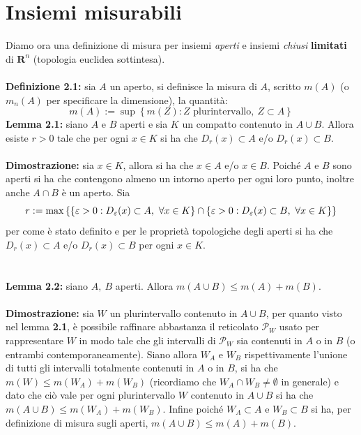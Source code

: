 \documentclass{article}
\begin{document}
\section{Insiemi misurabili}
Diamo ora una definizione di misura per insiemi \textit{aperti} e insiemi \textit{chiusi} \textbf{limitati }di $\mathbf{R}^n$ (topologia euclidea sottintesa). \\ \\
\textbf{Definizione 2.1:} sia $A$ un aperto, si definisce la misura di $A$, scritto $m(A)$ (o $m_n(A)$ per specificare la dimensione), la quantità:
\begin{equation}
    m(A) := \sup \left\{ m(Z) : Z \text{ plurintervallo}, \ Z \subset A \right\} \tag{2.1}
\end{equation}
\textbf{Lemma 2.1:} siano $A$ e $B$ aperti e sia $K$ un compatto contenuto in $A \cup B$. Allora esiste $r > 0$ tale che per ogni $x \in K$ si ha che $D_r(x) \subset A$ e/o $D_r(x) \subset B$. \\ \\
\textbf{Dimostrazione:} sia $x \in K$, allora si ha che $x \in A$ e/o $x \in B$. Poiché $A$ e $B$ sono aperti si ha che contengono almeno un intorno aperto per ogni loro punto, inoltre anche $A \cap B$ è un aperto. Sia
\begin{equation}
    r := \max \left\{ \left\{ \varepsilon > 0 : D_{\varepsilon} (x) \subset A, \ \forall x \in K \right\}\cap \left\{ \varepsilon > 0 : D_\varepsilon (x) \subset B, \ \forall x \in K \right\} \right\} \notag
\end{equation}
per come è stato definito e per le proprietà topologiche degli aperti si ha che $D_r(x) \subset A$ e/o $D_r(x) \subset B$ per ogni $x \in K$. \\ \\ \\
\textbf{Lemma 2.2:} siano $A, \ B$ aperti. Allora $m(A \cup B) \leq m(A) + m(B)$. \\ \\
\textbf{Dimostrazione:} sia $W$ un plurintervallo contenuto in $A \cup B$, per quanto visto nel lemma \textbf{2.1}, è possibile raffinare abbastanza il reticolato $\mathcal{P}_W$ usato per rappresentare $W$ in modo tale che gli intervalli di $\mathcal{P}_W$ sia contenuti in $A$ o in $B$ (o entrambi contemporaneamente). Siano allora $W_A$ e $W_B$ rispettivamente l'unione di tutti gli intervalli totalmente contenuti in $A$ o in $B$, si ha che $m(W) \leq m(W_A) + m(W_B)$ (ricordiamo che $W_A \cap W_B \neq \emptyset$ in generale) e dato che ciò vale per ogni plurintervallo $W$ contenuto in $A \cup B$ si ha che $m(A \cup B) \leq m(W_A) + m(W_B)$. Infine poiché $W_A \subset A$ e $W_B \subset B$ si ha, per definizione di misura sugli aperti, $m(A \cup B) \leq m(A) + m(B)$. \\ \\ \\
\end{document}
